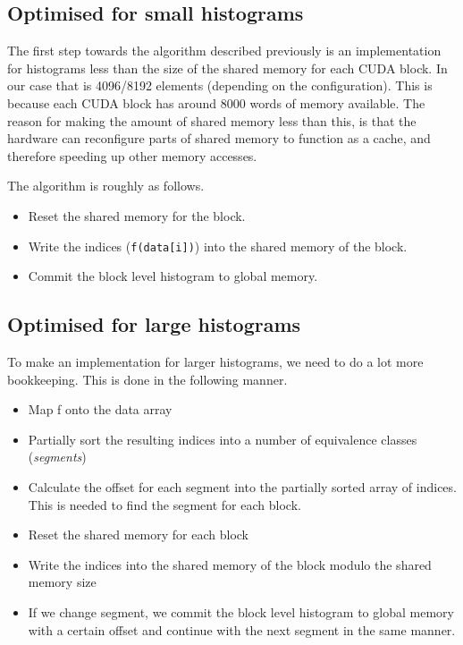 \documentclass[12pt, a4paper, hidelinks]{article}
\renewcommand{\tt}[1]{\texttt{#1}}
\renewcommand{\it}[1]{\textit{#1}}
\begin{document}
\subsection{Optimised for small histograms}
The first step towards the algorithm described previously is an implementation
for histograms less than the size of the shared memory for each CUDA block.
In our case that is 4096/8192 elements (depending on the configuration). This
is because each CUDA block has around 8000 words of memory available. The reason
for making the amount of shared memory less than this, is that the hardware can
reconfigure parts of shared memory to function as a cache, and therefore speeding
up other memory accesses.

The algorithm is roughly as follows.

\begin{itemize}
\item Reset the shared memory for the block.
\item Write the indices (\tt{f(data[i])}) into the shared memory of the block.
\item Commit the block level histogram to global memory.
\end{itemize}

\subsection{Optimised for large histograms}
To make an implementation for larger histograms, we need to do a lot more
bookkeeping. This is done in the following manner.

\begin{itemize}
\item
  Map f onto the data array
\item
  Partially sort the resulting indices into a number of equivalence classes (\it{segments})
\item
  Calculate the offset for each segment into
  the partially sorted array of indices.
  This is needed to find the segment for each block.
\item
  Reset the shared memory for each block
\item
  Write the indices into the shared memory of the block modulo the shared memory size
\item
  If we change segment,
  we commit the block level histogram to global memory with a certain
  offset and continue with the next segment in the same manner.
\end{itemize}
\end{document}
